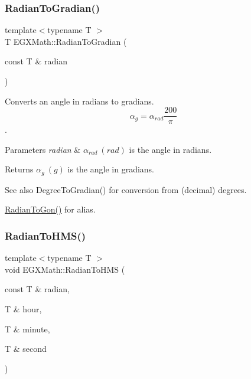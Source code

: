 \subsubsection{\texorpdfstring{Radian\+To\+Gradian()}{RadianToGradian()}}
{\footnotesize\ttfamily template$<$typename T $>$ \\
T E\+G\+X\+Math\+::\+Radian\+To\+Gradian (\begin{DoxyParamCaption}\item[{const T \&}]{radian }\end{DoxyParamCaption})}



Converts an angle in radians to gradians. \[\alpha_{g}=\alpha_{rad}\frac{200}{\pi}\]. 


\begin{DoxyParams}{Parameters}
{\em radian} & $\alpha_{rad}\ (rad)$ is the angle in radians. \\
\hline
\end{DoxyParams}
\begin{DoxyReturn}{Returns}
$\alpha_{g}\ (g)$ is the angle in gradians. 
\end{DoxyReturn}
\begin{DoxySeeAlso}{See also}
Degree\+To\+Gradian() for conversion from (decimal) degrees. 

\mbox{\hyperlink{group___e_g_x_math-_angle_conversions-_radian_ga36912e5a810b64c271c4dafc17f4ca45}{Radian\+To\+Gon()}} for alias. 
\end{DoxySeeAlso}
\mbox{\label{group___e_g_x_math-_angle_conversions-_radian_ga55b5fba9307f34ab8db57391789a90cc}} 
\subsubsection{\texorpdfstring{Radian\+To\+H\+M\+S()}{RadianToHMS()}}
{\footnotesize\ttfamily template$<$typename T $>$ \\
void E\+G\+X\+Math\+::\+Radian\+To\+H\+MS (\begin{DoxyParamCaption}\item[{const T \&}]{radian,  }\item[{T \&}]{hour,  }\item[{T \&}]{minute,  }\item[{T \&}]{second }\end{DoxyParamCaption})}



